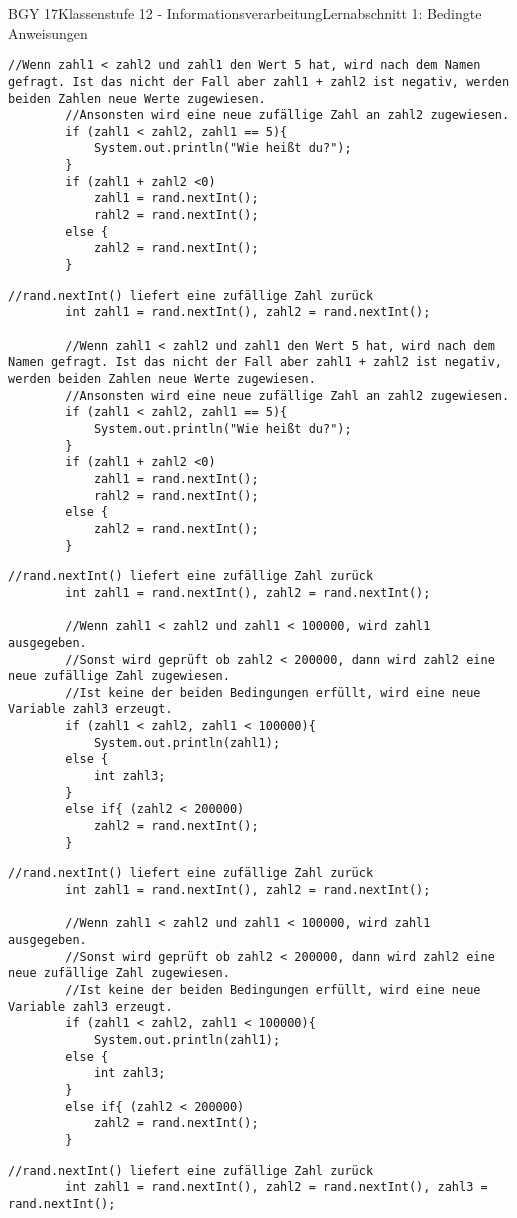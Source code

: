 \documentclass[oneside,openany,headings=optiontotoc,11pt,numbers=noenddot]{scrreprt}
\begin{document}
\begin{worksheet}{BGY 17}{Klassenstufe 12 - Informationsverarbeitung}{Lernabschnitt 1: Bedingte Anweisungen}
\begin{lstlisting}[style=JavaInputStyle]
		//Wenn zahl1 < zahl2 und zahl1 den Wert 5 hat, wird nach dem Namen gefragt. Ist das nicht der Fall aber zahl1 + zahl2 ist negativ, werden beiden Zahlen neue Werte zugewiesen.
		//Ansonsten wird eine neue zufällige Zahl an zahl2 zugewiesen.
		if (zahl1 < zahl2, zahl1 == 5){
			System.out.println("Wie heißt du?");
		}
		if (zahl1 + zahl2 <0)
			zahl1 = rand.nextInt();
			rahl2 = rand.nextInt();
		else {
			zahl2 = rand.nextInt();
		}
		\end{lstlisting}
		\newpage
		\begin{lstlisting}[style=JavaInputStyle]
		//rand.nextInt() liefert eine zufällige Zahl zurück
		int zahl1 = rand.nextInt(), zahl2 = rand.nextInt();
		
		//Wenn zahl1 < zahl2 und zahl1 den Wert 5 hat, wird nach dem Namen gefragt. Ist das nicht der Fall aber zahl1 + zahl2 ist negativ, werden beiden Zahlen neue Werte zugewiesen.
		//Ansonsten wird eine neue zufällige Zahl an zahl2 zugewiesen.
		if (zahl1 < zahl2, zahl1 == 5){
			System.out.println("Wie heißt du?");
		}
		if (zahl1 + zahl2 <0)
			zahl1 = rand.nextInt();
			rahl2 = rand.nextInt();
		else {
			zahl2 = rand.nextInt();
		}
		\end{lstlisting}
		\newpage
		\begin{lstlisting}[style=JavaInputStyle]
		//rand.nextInt() liefert eine zufällige Zahl zurück
		int zahl1 = rand.nextInt(), zahl2 = rand.nextInt();
		
		//Wenn zahl1 < zahl2 und zahl1 < 100000, wird zahl1 ausgegeben.
		//Sonst wird geprüft ob zahl2 < 200000, dann wird zahl2 eine neue zufällige Zahl zugewiesen.
		//Ist keine der beiden Bedingungen erfüllt, wird eine neue Variable zahl3 erzeugt.
		if (zahl1 < zahl2, zahl1 < 100000){
			System.out.println(zahl1);
		else {
			int zahl3;
		}
		else if{ (zahl2 < 200000)
			zahl2 = rand.nextInt();
		}
		\end{lstlisting}
		\newpage
		\begin{lstlisting}[style=JavaInputStyle]
		//rand.nextInt() liefert eine zufällige Zahl zurück
		int zahl1 = rand.nextInt(), zahl2 = rand.nextInt();
		
		//Wenn zahl1 < zahl2 und zahl1 < 100000, wird zahl1 ausgegeben.
		//Sonst wird geprüft ob zahl2 < 200000, dann wird zahl2 eine neue zufällige Zahl zugewiesen.
		//Ist keine der beiden Bedingungen erfüllt, wird eine neue Variable zahl3 erzeugt.
		if (zahl1 < zahl2, zahl1 < 100000){
			System.out.println(zahl1);
		else {
			int zahl3;
		}
		else if{ (zahl2 < 200000)
			zahl2 = rand.nextInt();
		}
		\end{lstlisting}
		\newpage
		\begin{lstlisting}[style=JavaInputStyle]
		//rand.nextInt() liefert eine zufällige Zahl zurück
		int zahl1 = rand.nextInt(), zahl2 = rand.nextInt(), zahl3 = rand.nextInt();
		

\end{lstlisting}
\end{worksheet}
\end{document}
